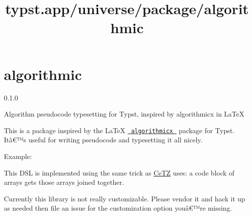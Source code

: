 \title{typst.app/universe/package/algorithmic}

\label{banner}
\section{algorithmic}\label{algorithmic}

{ 0.1.0 }

Algorithm pseudocode typesetting for Typst, inspired by algorithmicx in
LaTeX

\label{readme}
This is a package inspired by the LaTeX
\href{https://ctan.org/pkg/algorithmicx}{\texttt{\ algorithmicx\ }}
package for Typst. Itâ€™s useful for writing pseudocode and typesetting
it all nicely.


Example:

\begin{Shaded}
\begin{Highlighting}[]

\NormalTok{      \})}
\NormalTok{      \})}
\NormalTok{      \})}
\NormalTok{    \})}
\NormalTok{  \})}
\NormalTok{\})}
\end{Highlighting}
\end{Shaded}

This DSL is implemented using the same trick as
\href{https://github.com/johannes-wolf/typst-canvas}{CeTZ} uses: a code
block of arrays gets those arrays joined together.

Currently this library is not really customizable. Please vendor it and
hack it up as needed then file an issue for the customization option
youâ€™re missing.


